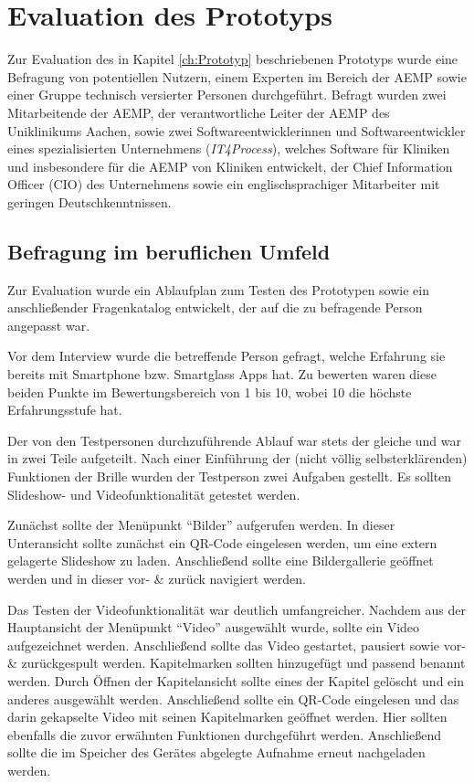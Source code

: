 %
%
%
%
%
%
\chapter{Evaluation des Prototyps}
\label{ch:Evaluation_des_Prototyps}
Zur Evaluation des in Kapitel \ref{ch:Prototyp} beschriebenen Prototyps wurde eine Befragung von potentiellen Nutzern, einem Experten im Bereich der AEMP sowie einer Gruppe technisch versierter Personen durchgeführt. Befragt wurden zwei
Mitarbeitende der AEMP, 
der verantwortliche Leiter der AEMP des Uniklinikums Aachen, 
sowie zwei Softwareentwicklerinnen und Softwareentwickler eines spezialisierten Unternehmens (\emph{IT4Process}), welches Software für Kliniken und insbesondere für die AEMP von Kliniken entwickelt, der Chief Information Officer (CIO) des Unternehmens sowie ein englischsprachiger Mitarbeiter mit geringen Deutschkenntnissen.
%
%
%
%
%
%
%
\section{Befragung im beruflichen Umfeld}
\label{sec:Befragung_im_Beruflichen_Umfeld}
Zur Evaluation wurde ein Ablaufplan zum Testen des Prototypen sowie ein anschließender Fragenkatalog entwickelt, der auf die zu befragende Person angepasst war. 

Vor dem Interview wurde die betreffende Person gefragt, welche Erfahrung sie bereits mit Smartphone bzw. Smartglass Apps hat. Zu bewerten waren diese beiden Punkte im Bewertungsbereich von 1 bis 10, wobei 10 die höchste Erfahrungsstufe hat.

Der von den Testpersonen durchzuführende Ablauf war stets der gleiche und war in zwei Teile aufgeteilt. Nach einer Einführung der (nicht völlig selbsterklärenden) Funktionen der Brille wurden der Testperson zwei Aufgaben gestellt. Es sollten Slideshow- und Videofunktionalität getestet werden. 

Zunächst sollte der Menüpunkt \enquote{Bilder} aufgerufen werden. In dieser Unteransicht sollte zunächst ein QR-Code eingelesen werden, um eine extern gelagerte Slideshow zu laden. Anschließend sollte eine Bildergallerie geöffnet werden und in dieser vor- \& zurück navigiert werden.

Das Testen der Videofunktionalität war deutlich umfangreicher. Nachdem aus der Hauptansicht der Menüpunkt \enquote{Video} ausgewählt wurde, sollte ein Video aufgezeichnet werden. Anschließend sollte das Video gestartet, pausiert sowie vor- \& zurückgespult werden. Kapitelmarken sollten hinzugefügt und passend benannt werden. Durch Öffnen der Kapitelansicht sollte eines der Kapitel gelöscht und ein anderes ausgewählt werden. Anschließend sollte ein QR-Code eingelesen und das darin gekapselte Video mit seinen Kapitelmarken geöffnet werden. Hier sollten ebenfalls die zuvor erwähnten Funktionen durchgeführt werden. Anschließend sollte die im Speicher des Gerätes abgelegte Aufnahme erneut nachgeladen werden.

